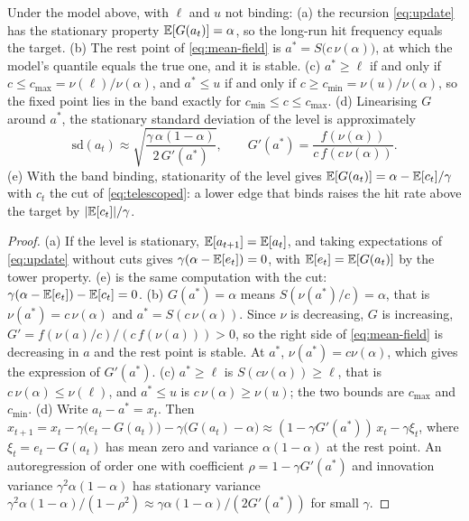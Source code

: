 \begin{proposition}
\label{prop:fixed-point}
Under the model above, with $\ell$ and $u$ not binding: (a) the recursion \cref{eq:update} has the stationary property $\mathbb{E}[G(a_t)] = \alpha$, so the long-run hit frequency equals the target. (b) The rest point of \cref{eq:mean-field} is $a^* = S\bigl(c\,\nu(\alpha)\bigr)$, at which the model's quantile equals the true one, and it is stable. (c) $a^* \ge \ell$ if and only if $c \le c_{\max} = \nu(\ell)/\nu(\alpha)$, and $a^* \le u$ if and only if $c \ge c_{\min} = \nu(u)/\nu(\alpha)$, so the fixed point lies in the band exactly for $c_{\min} \le c \le c_{\max}$. (d) Linearising $G$ around $a^*$, the stationary standard deviation of the level is approximately
\begin{equation}
\mathrm{sd}(a_t) \approx \sqrt{\frac{\gamma\,\alpha(1-\alpha)}{2\,G'(a^*)}}, \qquad G'(a^*) = \frac{f(\nu(\alpha))}{c\,f(c\,\nu(\alpha))}.
\label{eq:spread}
\end{equation}
(e) With the band binding, stationarity of the level gives $\mathbb{E}[G(a_t)] = \alpha - \mathbb{E}[c_t]/\gamma$ with $c_t$ the cut of \cref{eq:telescoped}: a lower edge that binds raises the hit rate above the target by $|\mathbb{E}[c_t]|/\gamma$.
\end{proposition}
\begin{proof}
(a) If the level is stationary, $\mathbb{E}[a_{t+1}] = \mathbb{E}[a_t]$, and taking expectations of \cref{eq:update} without cuts gives $\gamma(\alpha - \mathbb{E}[e_t]) = 0$, with $\mathbb{E}[e_t] = \mathbb{E}[G(a_t)]$ by the tower property. (e) is the same computation with the cut: $\gamma(\alpha - \mathbb{E}[e_t]) - \mathbb{E}[c_t] = 0$. (b) $G(a^*) = \alpha$ means $S(\nu(a^*)/c) = \alpha$, that is $\nu(a^*) = c\,\nu(\alpha)$ and $a^* = S(c\,\nu(\alpha))$. Since $\nu$ is decreasing, $G$ is increasing, $G' = f(\nu(a)/c)/(c\,f(\nu(a))) > 0$, so the right side of \cref{eq:mean-field} is decreasing in $a$ and the rest point is stable. At $a^*$, $\nu(a^*) = c\nu(\alpha)$, which gives the expression of $G'(a^*)$. (c) $a^* \ge \ell$ is $S(c\nu(\alpha)) \ge \ell$, that is $c\,\nu(\alpha) \le \nu(\ell)$, and $a^* \le u$ is $c\,\nu(\alpha) \ge \nu(u)$; the two bounds are $c_{\max}$ and $c_{\min}$. (d) Write $a_t - a^* = x_t$. Then $x_{t+1} = x_t - \gamma\bigl(e_t - G(a_t)\bigr) - \gamma\bigl(G(a_t) - \alpha\bigr) \approx (1 - \gamma G'(a^*))\,x_t - \gamma\xi_t$, where $\xi_t = e_t - G(a_t)$ has mean zero and variance $\alpha(1-\alpha)$ at the rest point. An autoregression of order one with coefficient $\rho = 1 - \gamma G'(a^*)$ and innovation variance $\gamma^2\alpha(1-\alpha)$ has stationary variance $\gamma^2\alpha(1-\alpha)/(1-\rho^2) \approx \gamma\alpha(1-\alpha)/(2G'(a^*))$ for small $\gamma$.
\end{proof}

